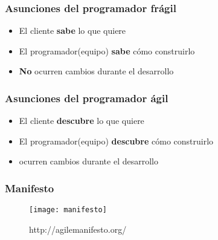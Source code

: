 \begin{frame}
  \frametitle{Asunciones del programador frágil}
  \begin{itemize}
  \item El cliente \textbf{sabe} lo que quiere
  \item El programador(equipo) \textbf{sabe} cómo construirlo
  \item \textbf{No} ocurren cambios durante el desarrollo
  \end{itemize}
\end{frame}

\begin{frame}
  \frametitle{Asunciones del programador ágil}
  \begin{itemize}
  \item El cliente \textbf{ descubre} lo que quiere
  \item El programador(equipo) \textbf{ descubre} cómo construirlo
  \item \textbf{} ocurren cambios durante el desarrollo
  \end{itemize}
\end{frame}

\begin{frame}
  \frametitle{Manifesto}
  \begin{figure}[ht]
    \texttt{[image: manifesto]}
    \caption{http://agilemanifesto.org/}
  \end{figure}
\end{frame}
